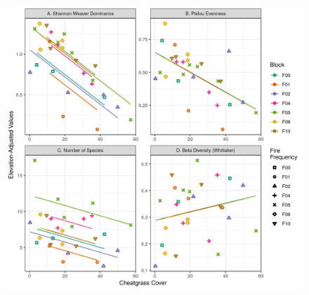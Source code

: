 \documentclass[]{article}
\begin{document}
\clearpage
\newpage

\begin{figure}
 
  \begin{center}
    \includegraphics{figures/brte_div.png}
    \caption{}
  \end{center}
\end{figure}
\end{document}
